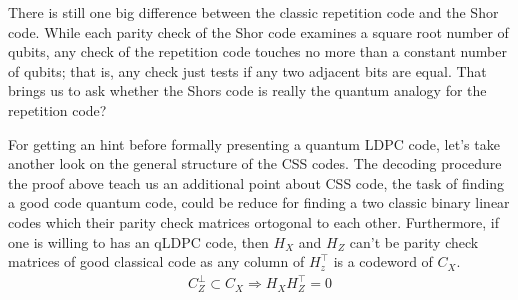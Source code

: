   There is still one big difference between the classic repetition code and the Shor code. While each parity check of the Shor code examines a square root number of qubits, any check of the repetition code touches no more than a constant number of qubits; that is, any check just tests if any two adjacent bits are equal.  That brings us to ask whether the Shors code is really the quantum analogy for the repetition code? 

  For getting an hint before formally presenting a quantum LDPC code, let's take another look on the general structure of the CSS codes. The decoding procedure the proof above teach us an additional point about CSS code, the task of finding a good code quantum code, could be reduce for finding a two classic binary linear codes which their parity check matrices ortogonal to each other. Furthermore, if one is willing to has an qLDPC code, then $H_{X}$ and $H_{Z}$ can't be parity check matrices of good classical code as any column of $H_{z}^{\top}$ is a codeword of $C_{X}$. 
  \begin{equation*}
    \begin{split}
      C_{Z}^{\perp} \subset C_{X} \Rightarrow H_{X}H_{Z}^{\top} = 0 
    \end{split}
  \end{equation*}


\ifdefined\CSSDOC

\fi 
